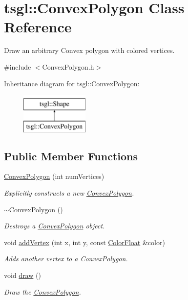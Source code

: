 \hypertarget{classtsgl_1_1_convex_polygon}{\section{tsgl\-:\-:\-Convex\-Polygon \-Class \-Reference}
\label{classtsgl_1_1_convex_polygon}
}


\-Draw an arbitrary \-Convex polygon with colored vertices.  




{\ttfamily \#include $<$\-Convex\-Polygon.\-h$>$}

\-Inheritance diagram for tsgl\-:\-:\-Convex\-Polygon\-:\begin{figure}[H]
\begin{center}
\leavevmode
\includegraphics[height=2.000000cm]{classtsgl_1_1_convex_polygon}
\end{center}
\end{figure}
\subsection*{\-Public \-Member \-Functions}
\begin{DoxyCompactItemize}
\item 
\hyperlink{classtsgl_1_1_convex_polygon_ae9d826f3b3155fe84016e6efbcbd2b64}{\-Convex\-Polygon} (int num\-Vertices)
\begin{DoxyCompactList}\small\item\em \-Explicitly constructs a new \hyperlink{classtsgl_1_1_convex_polygon}{\-Convex\-Polygon}. \end{DoxyCompactList}\item 
\hyperlink{classtsgl_1_1_convex_polygon_a46a5bde76d6843d47c754a04cc847e64}{$\sim$\-Convex\-Polygon} ()
\begin{DoxyCompactList}\small\item\em \-Destroys a \hyperlink{classtsgl_1_1_convex_polygon}{\-Convex\-Polygon} object. \end{DoxyCompactList}\item 
void \hyperlink{classtsgl_1_1_convex_polygon_a60d17a5ac80a796d05dfeff855791cc0}{add\-Vertex} (int x, int y, const \hyperlink{structtsgl_1_1_color_float}{\-Color\-Float} \&color)
\begin{DoxyCompactList}\small\item\em \-Adds another vertex to a \hyperlink{classtsgl_1_1_convex_polygon}{\-Convex\-Polygon}. \end{DoxyCompactList}\item 
void \hyperlink{classtsgl_1_1_convex_polygon_add4d4971a5d22385eebbfe771af916b5}{draw} ()
\begin{DoxyCompactList}\small\item\em \-Draw the \hyperlink{classtsgl_1_1_convex_polygon}{\-Convex\-Polygon}. \end{DoxyCompactList}\end{DoxyCompactItemize}
